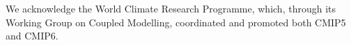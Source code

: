 \documentclass[gmd, manuscript]{copernicus}
\begin{document}
\begin{acknowledgements}
We acknowledge the World Climate Research Programme, which, through its Working Group on Coupled Modelling, coordinated and promoted both CMIP5 and CMIP6.
\end{acknowledgements}




















\end{document}
